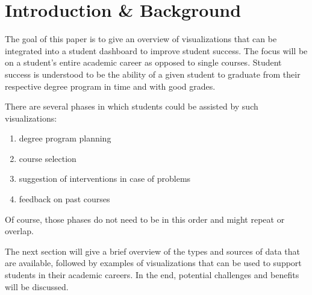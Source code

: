 \section{Introduction \& Background}
\label{sec:introcution}

The goal of this paper is to give an overview of visualizations that can be integrated into a student dashboard to improve student success.
The focus will be on a student's entire academic career as opposed to single courses.
Student success is understood to be the ability of a given student to graduate from their respective degree program in time and with good grades.

There are several phases in which students could be assisted by such visualizations:

\begin{enumerate}
    \item degree program planning
    \item course selection
    \item suggestion of interventions in case of problems
    \item feedback on past courses
\end{enumerate}

Of course, those phases do not need to be in this order and might repeat or overlap.

The next section will give a brief overview of the types and sources of data that are available, followed by examples of visualizations that can be used to support students in their academic careers.
In the end, potential challenges and benefits will be discussed.
